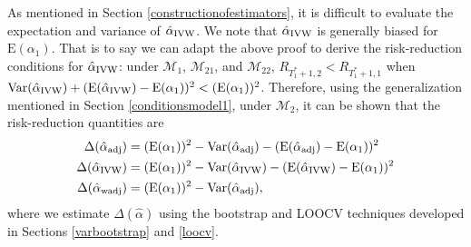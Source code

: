 \documentclass[11pt]{article}
\def\mrm#1{\mathrm{#1}} %
\def\mc#1{\mathcal{#1}} %
\def\E#1{\mathrm{E}(#1)} %
\def\var#1{\mathrm{Var}(#1)} %
\theoremstyle{definition}
\begin{document}
 


As mentioned in Section \ref{constructionofestimators}, it is difficult to evaluate the expectation and variance of $\hat{\alpha}_{\rm IVW}$. We note that $\hat{\alpha}_{\rm IVW}$ is generally biased for $\E{\alpha_1}$. That is to say we can adapt the above proof to derive the risk-reduction conditions for $\hat{\alpha}_{\rm IVW}$: under $\mc{M}_{1}$, $\mc{M}_{21}$, and $\mc{M}_{22}$, $R_{T_1^*+1,2}<R_{T_1^*+1,1}$ when $\var{\hat{\alpha}_{\rm IVW}} +(\E{\hat{\alpha}_{\rm IVW}}-\E{\alpha_1})^2<(\E{\alpha_1})^2$.  Therefore, using the generalization mentioned in Section \ref{conditionsmodel1}, under $\mc{M}_2$, it can be shown that the risk-reduction quantities are
\begin{align*}
  \Delta(\hat{\alpha}_{\rm adj}) 
  &= (\E{\alpha_1})^2 -\var{\hat{\alpha}_{\rm adj}}-(\E{\hat{\alpha}_{\rm adj}}-\E{\alpha_1})^2\\
  \Delta(\hat{\alpha}_{\rm IVW}) 
  &= (\E{\alpha_1})^2 -\var{\hat{\alpha}_{\rm IVW}}-(\E{\hat{\alpha}_{\rm IVW}}-\E{\alpha_1})^2\\
  \Delta(\hat{\alpha}_{\rm wadj}) 
  &= (\E{\alpha_1})^2 -\var{\hat{\alpha}_{\rm adj}},
\end{align*}
where we estimate $\Delta(\hat{\alpha})$  using the bootstrap and LOOCV techniques developed in Sections \ref{varbootstrap} and \ref{loocv}. 
 

\end{document}
